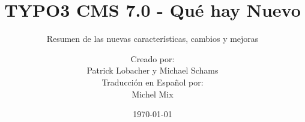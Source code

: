 %

%
%

\documentclass[t]{beamer}

\beamertemplatenavigationsymbolsempty

{
	\usetheme{typo3slides}
}

\title{TYPO3 CMS 7.0 - Qué hay Nuevo}
\subtitle{Resumen de las nuevas características, cambios y mejoras}
\author{
	\centerline{Creado por:}
	\centerline{Patrick Lobacher y Michael Schams}
	\vspace{0.4cm}
	\centerline{Traducción en Español por:}
	\centerline{Michel Mix}
}

\date{\today}



\sharefont


\begingroup
	[default]
	\begin{frame}
		\titlepage
	\end{frame}
\endgroup



\section*{TYPO3 CMS 7.0 - Qué hay Nuevo}
\begin{frame}[fragile]
	\frametitle{Resumen de Capítulos}
	\framesubtitle{Resumen de Capítulos}

	\begin{multicols}{2}
		\tableofcontents
	\end{multicols}

\end{frame}

